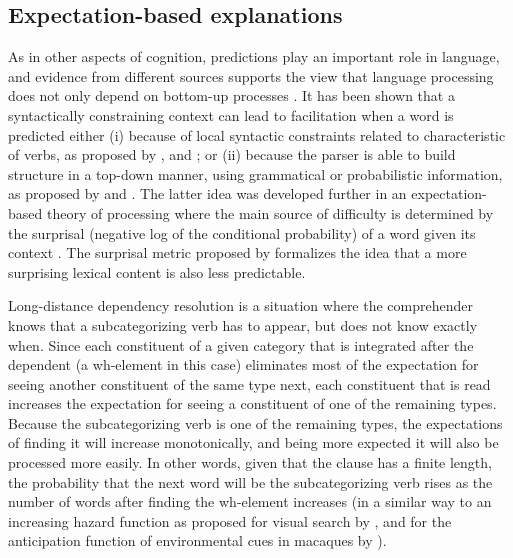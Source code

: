 \documentclass{frontiersSCNS}\usepackage{knitr}
\begin{document}
\subsection{Expectation-based explanations} 
As in other aspects of cognition,  predictions play an important role in language, and evidence from different sources supports the view that language processing does not only depend on bottom-up processes \citep[for a review of prediction in language see:][]{KutasEtAl2011}. It has been shown that a syntactically constraining context can lead to facilitation when a word is predicted either (i) because of local syntactic constraints related to characteristic of verbs, as proposed by \citet{TrueswellEtAl1993}, and \citet{Konieczny2000}; or (ii) because the parser is able to build structure in a top-down manner, using grammatical or probabilistic 
information, as proposed by \citet{Jurafsky1996} and \citet{Hale2001}. The latter idea was developed further in an expectation-based theory of processing \citep{Levy2008} where the main source of difficulty is determined by the surprisal (negative log of the conditional probability) of a word given its context \citep[as proposed by ][]{Hale2001}. The surprisal metric proposed by \citeauthor{Hale2001} formalizes the idea that a more surprising lexical content is also less predictable.

Long-distance dependency resolution is a situation where the comprehender knows that a subcategorizing verb has to appear, but does not know exactly when. Since each constituent of a given category that is integrated after the dependent (a wh-element in this case) eliminates most of the expectation for seeing another constituent of the same type next, each constituent that is read  increases the expectation for seeing a constituent of one of the remaining types. Because the subcategorizing verb is one of the remaining types, the expectations of finding it will increase monotonically, and being more expected it will also be processed more easily. In other words, given that the clause has a finite
length, the probability that the next word will be the subcategorizing verb rises as the number of words after finding
the wh-element increases (in a similar way to an increasing hazard function as proposed for visual search by \citealp{PetersonEtAl2001}, and for the anticipation function of environmental cues in macaques by \citealp{JanssenShadlen2005}).
\end{document}

